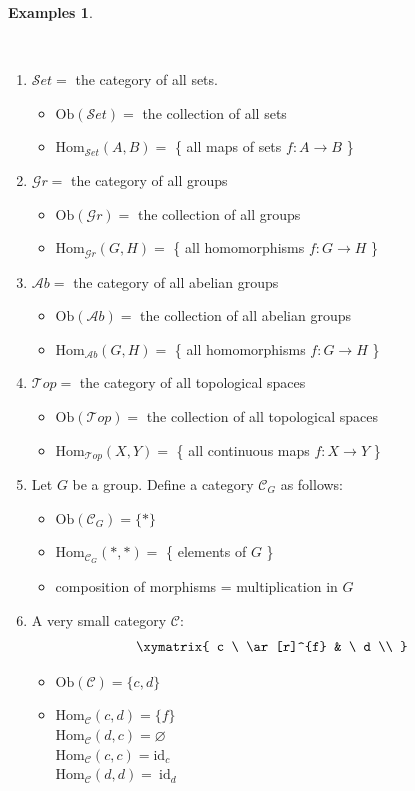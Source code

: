 \documentclass[12pt, letterpaper, oneside]{article}
\theoremstyle{plain}
\theoremstyle{definition}
\newtheorem{examples}[theorem]{Examples}
\newcommand{\Hom}{\mathrm{Hom}}
\newcommand{\Ob}{\mathrm{Ob}}
\newcommand{\id}{\mathrm{id}}
\newcommand{\CC}{{\mathcal C}}
\newcommand{\Ab}{{\mathcal Ab}}
\newcommand{\Gr}{{\mathcal Gr}}
\newcommand{\Top}{{\mathcal Top}}
\newcommand{\Set}{{\mathcal Set}}
\newcommand{\benu}{\begin{enumerate}}
\newcommand{\eenu}{\end{enumerate}}
\newcommand{\bit}{\begin{itemize}}
\newcommand{\eit}{\end{itemize}}
\newcommand{\isep}[1][0]{\setlength{\itemsep}{#1 mm}}
\begin{document}
\begin{examples} \ \newline

\vskip -15mm

\ 
\benu
\isep[6]
\item $\Set = $ the category of all sets. 
\bit
\item $\Ob(\Set) = $ the collection of all sets
\item $\Hom_{\Set}(A, B) = $ \{ all maps of sets $f\colon A\to B$ \}
\eit



\item $\Gr = $ the category of all groups
\bit
\item $\Ob(\Gr) = $ the collection of all groups
\item $\Hom_{\Gr}(G, H) = $ \{ all homomorphisms  $f\colon G\to H$ \}
\eit

\item $\Ab = $ the category of all abelian groups
\bit
\item $\Ob(\Ab) = $ the collection of all abelian groups
\item $\Hom_{\Ab}(G, H) = $ \{ all homomorphisms  $f\colon G\to H$ \}
\eit


\item $\Top = $ the category of all topological spaces
\bit
\item $\Ob(\Top) = $ the collection of all topological spaces
\item $\Hom_{\Top}(X, Y) = $ \{ all continuous maps  $f\colon X\to Y$ \}
\eit

\item Let $G$ be a group. Define a category $\CC_{G}$ as follows:
\bit
\item $\Ob(\CC_{G}) = \{\ast \}$
\item $\Hom_{\CC_{G}}(\ast, \ast) = $ \{ elements of $G$ \}
\item composition of morphisms = multiplication in $G$
\eit

\item A very small category $\CC$:
$$
\xymatrix{
c \   \ar[r]^{f}   &  \ d \\
}
$$
\bit
\item $\Ob(\CC) = \{ c, d \}$
\item $\Hom_{\CC}(c, d) = \{f\}$ \\  
$ \Hom_{\CC}(d, c) = \varnothing$ \\
$\Hom_{\CC}(c, c) = \id_{c}$ \\   
$\Hom_{\CC}(d, d) =~\id_{d}$

\eit

\eenu

\end{examples}
\end{document}
